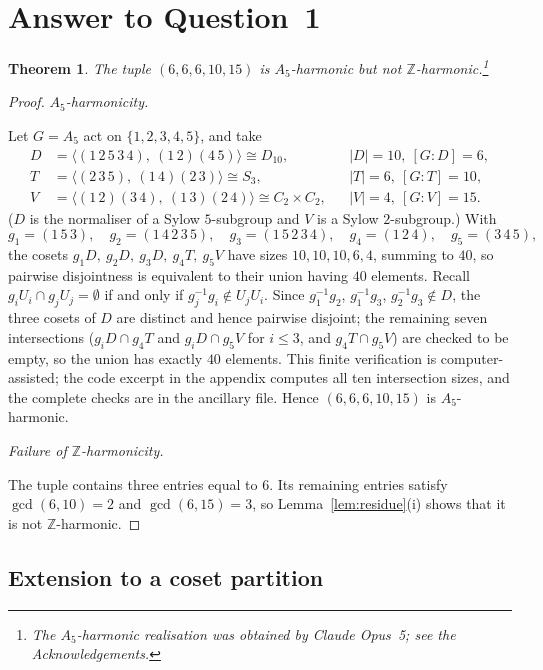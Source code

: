 \documentclass[12pt]{article}
\newtheorem{theorem}{Theorem}[section]
\theoremstyle{remark}
\newcommand{\Z}{\mathbb{Z}}
\begin{document}
\section{Answer to Question~1}

\begin{theorem}\label{thm:A5}
The tuple $(6,6,6,10,15)$ is $A_5$-harmonic but not $\Z$-harmonic.\footnote{The $A_5$-harmonic realisation was obtained by Claude Opus~5; see the Acknowledgements.}
\end{theorem}

\begin{proof}
\smallskip
\noindent\emph{$A_5$-harmonicity.}

Let $G = A_5$ act on $\{1,2,3,4,5\}$, and take
\[
\begin{aligned}
D &= \langle (1\,2\,5\,3\,4),\ (1\,2)(4\,5)\rangle \cong D_{10}, && |D|=10,\ [G:D]=6,\\
T &= \langle (2\,3\,5),\ (1\,4)(2\,3)\rangle \cong S_3, && |T|=6,\ [G:T]=10,\\
V &= \langle (1\,2)(3\,4),\ (1\,3)(2\,4)\rangle \cong C_2\times C_2, && |V|=4,\ [G:V]=15.
\end{aligned}
\]
($D$ is the normaliser of a Sylow $5$-subgroup and $V$ is a Sylow $2$-subgroup.) With
\[
g_1 = (1\,5\,3),\quad g_2 = (1\,4\,2\,3\,5),\quad g_3 = (1\,5\,2\,3\,4),\quad g_4 = (1\,2\,4),\quad g_5 = (3\,4\,5),
\]
the cosets $g_1D,\ g_2D,\ g_3D,\ g_4T,\ g_5V$ have sizes $10,10,10,6,4$, summing to $40$, so pairwise disjointness is equivalent to their union having $40$ elements. Recall $g_iU_i\cap g_jU_j=\emptyset$ if and only if $g_j^{-1}g_i\notin U_jU_i$. Since $g_1^{-1}g_2$, $g_1^{-1}g_3$, $g_2^{-1}g_3\notin D$, the three cosets of $D$ are distinct and hence pairwise disjoint; the remaining seven intersections ($g_iD\cap g_4T$ and $g_iD\cap g_5V$ for $i\le 3$, and $g_4T\cap g_5V$) are checked to be empty, so the union has exactly $40$ elements. This finite verification is computer-assisted; the code excerpt in the appendix computes all ten intersection sizes, and the complete checks are in the ancillary file. Hence $(6,6,6,10,15)$ is $A_5$-harmonic.

\smallskip
\noindent\emph{Failure of $\Z$-harmonicity.}

The tuple contains three entries equal to $6$. Its remaining entries satisfy
$\gcd(6,10)=2$ and $\gcd(6,15)=3$, so Lemma~\ref{lem:residue}(i) shows that
it is not $\Z$-harmonic.
\end{proof}

\subsection{Extension to a coset partition}
\end{document}
